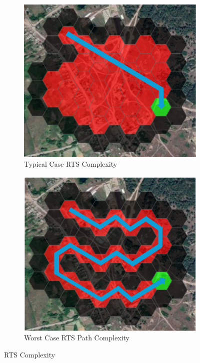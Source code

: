 \begin{figure}[htbp]
  \centering
  \begin{subfigure}[b]{0.48\textwidth}
    \includegraphics[width=\textwidth]{figs/Thomas/Return To Safety/typical_case_complexity.png}
    \caption{Typical Case RTS Complexity}
    \label{fig:typical_case}
  \end{subfigure}
  \hfill
  \begin{subfigure}[b]{0.48\textwidth}
    \includegraphics[width=\textwidth]{figs/Thomas/Return To Safety/worst_case_complexity.png}
    \caption{Worst Case RTS Path Complexity}
    \label{fig:worst_case}
\end{subfigure}
\caption{RTS Complexity}
\label{fig:rts_complexity}
\end{figure}